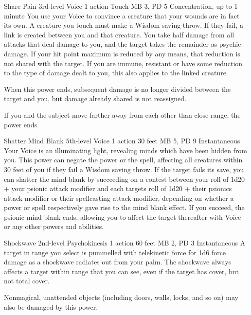 \DndPowerHeader%
  {Share Pain}
  {3rd-level Voice}
  {1 action}
  {Touch}
  {MB 3, PD 5}
  {Concentration, up to 1 minute}
  You use your Voice to convince a creature that your wounds are
  in fact its own.
  A creature you touch must make a Wisdom saving throw.
  If they fail, a link is created between you and that creature.
  You take half damage from all attacks that deal damage to you,
  and the target takes the remainder as psychic damage.
  If your hit point maximum is reduced by any means,
  that reduction is not shared with the target.
  If you are immune, resistant or have some reduction
  to the type of damage dealt to you,
  this also applies to the linked creature. 
  
  When this power ends,
  subsequent damage is no longer divided between the target and you,
  but damage already shared is not reassigned.

  If you and the subject move farther away from each other
  than close range, the power ends.

\DndPowerHeader%
  {Shatter Mind Blank}
  {5th-level Voice}
  {1 action}
  {30 feet}
  {MB 5, PD 9}
  {Instantaneous}
  Your Voice is an illuminating light,
  revealing minds which have been hidden from you.
  This power can negate the  power
  or the  spell,
  affecting all creatures within 30 feet of you
  if they fail a Wisdom saving throw.
  If the target fails its save,
  you can shatter the mind blank by succeeding on a
  contest between your roll of
  1d20 + your psionic attack modifier
  and each targets roll of 
  1d20 + their psionics attack modifier or
  their spellcasting attack modifier,
  depending on whether a power or spell respectively
  gave rise to the mind blank effect.
  If you succeed,
  the psionic mind blank ends,
  allowing you to affect the target thereafter
  with Voice or any other powers and abilities.

\DndPowerHeader%
  {Shockwave}
  {2nd-level Psychokinesis}
  {1 action}
  {60 feet}
  {MB 2, PD 3}
  {Instantaneous}
A target in range you select is pummelled with telekinetic force
for 1d6 force damage as a shockwave radiates out from your palm.
The shockwave always affects a target within range that you can see,
even if the target has cover, but not total cover.

Nonmagical, unattended objects
(including doors, walls, locks, and so on)
may also be damaged by this power.

